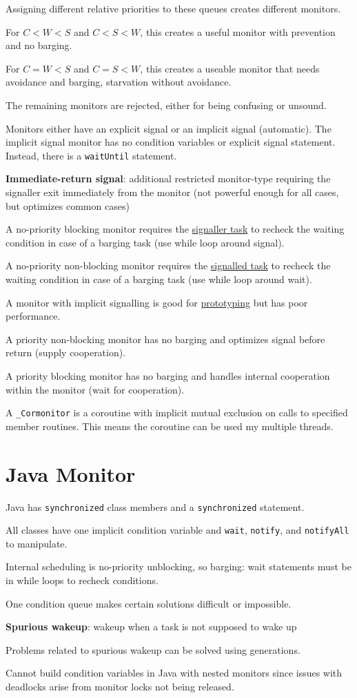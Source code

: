 \documentclass[11pt]{article}
\begin{document}
Assigning different relative priorities to these queues creates different monitors.

For \(C < W < S\) and \(C < S < W\), this creates a useful monitor with prevention and no barging.

For \(C = W < S\) and \(C = S < W\), this creates a useable monitor that needs avoidance and barging, starvation
without avoidance.

The remaining monitors are rejected, either for being confusing or unsound.

Monitors either have an explicit signal or an implicit signal (automatic).
The implicit signal monitor has no condition variables or explicit signal statement.
Instead, there is a \texttt{waitUntil} statement.

\textbf{Immediate-return signal}: additional restricted monitor-type requiring the signaller exit immediately
from the monitor (not powerful enough for all cases, but optimizes common cases)

A no-priority blocking monitor requires the \uline{signaller task} to recheck the waiting condition in case of
a barging task (use while loop around signal).

A no-priority non-blocking monitor requires the \uline{signalled task} to recheck the waiting condition in case of
a barging task (use while loop around wait).

A monitor with implicit signalling is good for \uline{prototyping} but has poor performance.

A priority non-blocking monitor has no barging and optimizes signal before return (supply cooperation).

A priority blocking monitor has no barging and handles internal cooperation within the monitor (wait for
cooperation).

A \texttt{\_Cormonitor} is a coroutine with implicit mutual exclusion on calls to specified member routines.
This means the coroutine can be used my multiple threads.
\section{Java Monitor}
\label{sec:org127b22d}
Java has \texttt{synchronized} class members and a \texttt{synchronized} statement.

All classes have one implicit condition variable and \texttt{wait}, \texttt{notify}, and \texttt{notifyAll} to manipulate.

Internal scheduling is no-priority unblocking, so barging: wait statements must be in while loops
to recheck conditions.

One condition queue makes certain solutions difficult or impossible.

\textbf{Spurious wakeup}: wakeup when a task is not supposed to wake up

Problems related to spurious wakeup can be solved using generations.

Cannot build condition variables in Java with nested monitors since issues with deadlocks arise
from monitor locks not being released.
\end{document}
